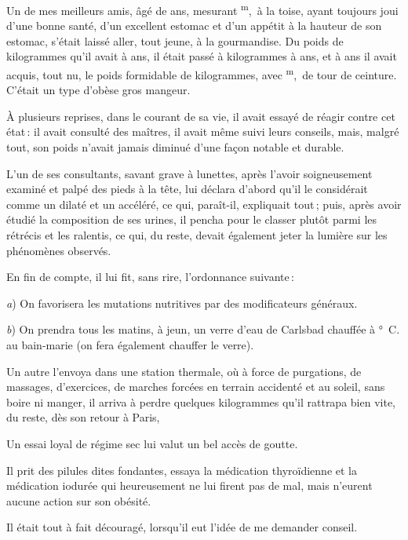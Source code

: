 Un de mes meilleurs amis, âgé de {\mmm} ans, mesurant
{\mmm}\textsuperscript{m}, {\mmm} à la toise, ayant toujours joui
d'une bonne santé, d'un excellent estomac et d'un appétit à la hauteur de son
estomac, s'était laissé aller, tout jeune, à la gourmandise. Du poids de
{\mmm} kilogrammes qu'il avait à {\mmm} ans, il était passé
à {\mmm} kilogrammes à {\mmm} ans, et à {\mmm} ans il avait
acquis, tout nu, le poids formidable de {\mmm} kilogrammes, avec
{\mmm}\textsuperscript{m}, {\mmm} de tour de ceinture. C'était un
type d’obèse gros mangeur.

À plusieurs reprises, dans le courant de sa vie, il avait essayé de réagir
contre cet état : il avait consulté des maîtres, il avait même suivi leurs
conseils, mais, malgré tout, son poids n'avait jamais diminué d’une façon
notable et durable.

L'un de ses consultants, savant grave à lunettes, après l'avoir soigneusement
examiné et palpé des pieds à la tête, lui déclara d'abord qu'il le considérait
comme un dilaté et un accéléré, ce qui, paraît-il, expliquait tout ; puis,
après avoir étudié la composition de ses urines, il pencha pour le classer
plutôt parmi les rétrécis et les ralentis, ce qui, du reste, devait également
jeter la lumière sur les phénomènes observés.

En fin de compte, il lui fit, sans rire, l'ordonnance suivante :

\textit{a}) On favorisera les mutations nutritives par des modificateurs
généraux.

\textit{b}) On prendra tous les matins, à jeun, un verre d'eau de Carlsbad
chauffée à {\mmm}° C. au bain-marie (on fera également chauffer le
verre).

Un autre l'envoya dans une station thermale, où à force de purgations, de
massages, d'exercices, de marches forcées en terrain accidenté et au soleil,
sans boire ni manger, il arriva à perdre quelques kilogrammes qu'il rattrapa
bien vite, du reste, dès son retour à Paris,

Un essai loyal de régime sec lui valut un bel accès de goutte.

Il prit des pilules dites fondantes, essaya la médication thyroïdienne et la
médication iodurée qui heureusement ne lui firent pas de mal, mais n'eurent
aucune action sur son obésité.

Il était tout à fait découragé, lorsqu'il eut l'idée de me demander conseil.

